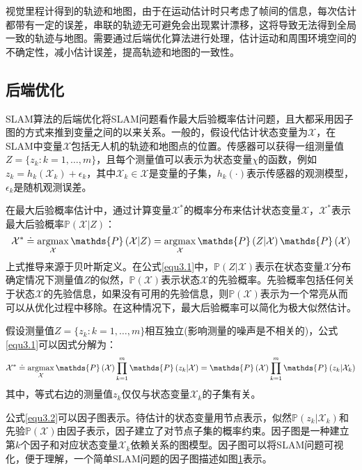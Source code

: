 视觉里程计得到的轨迹和地图，由于在运动估计时只考虑了帧间的信息，每次估计都带有一定的误差，串联的轨迹无可避免会出现累计漂移，这将导致无法得到全局一致的轨迹与地图。需要通过后端优化算法进行处理，估计运动和周围环境空间的不确定性，减小估计误差，提高轨迹和地图的一致性。


\subsection{后端优化}
SLAM算法的后端优化将SLAM问题看作最大后验概率估计问题，且大都采用因子图的方式来推到变量之间的以来关系。一般的，假设代估计状态变量为$\mathcal{X}$，在SLAM中变量$\mathcal{X}$包括无人机的轨迹和地图点的位置。传感器可以获得一组测量值$Z=\lbrace z_k:k=1,\ldots ,m\rbrace$，且每个测量值可以表示为状态变量$\chi$的函数，例如$z_k=h_k\left( \mathcal{X}_k \right)+\epsilon_k$，其中$\mathcal{X}_k \in \mathcal{X}$是变量的子集，$h_k(\cdot)$表示传感器的观测模型，$\epsilon_k$是随机观测误差。

在最大后验概率估计中，通过计算变量$\mathcal{X}^*$的概率分布来估计状态变量$\mathcal{X}$，$\mathcal{X}^*$表示最大后验概率$\mathds{P}\left(\mathcal{X} \vert Z\right)$：
\begin{equation}
\label{equ3.1}
\mathcal{X}^* 
\doteq 
\argmax \limits_{\mathcal{X}} \mathds{P}\left(\mathcal{X} \vert Z\right) 
=
\argmax \limits_{\mathcal{X}}\mathds{P}\left(Z \vert \mathcal{X}  \right)\mathds{P}\left(\mathcal{X}\right)
\end{equation}
上式推导来源于贝叶斯定义。在公式\ref{equ3.1}中，$\mathds{P}\left(Z \vert \mathcal{X}  \right)$表示在状态变量$\mathcal{X}$分布确定情况下测量值$Z$的似然，$\mathds{P}\left(\mathcal{X}\right)$表示状态$\mathcal{X}$的先验概率。先验概率包括任何关于状态$\mathcal{X}$的先验信息，如果没有可用的先验信息，则$\mathds{P}\left(\mathcal{X}\right)$表示为一个常亮从而可以从优化过程中移除。在这种情况下，最大后验概率可以简化为极大似然估计。

假设测量值$Z=\lbrace z_k:k=1,\ldots ,m\rbrace$相互独立(影响测量的噪声是不相关的)，公式\ref{equ3.1}可以因式分解为：
\begin{equation}
\label{equ3.2}
\mathcal{X}^* 
\doteq 
\argmax \limits_{\mathcal{X}} \mathds{P}\left(\mathcal{X}\right) \prod \limits_{k=1}^{m} \mathds{P}\left(z_k \vert \mathcal{X}  \right)
=
\mathds{P}\left(\mathcal{X}\right) \prod \limits_{k=1}^{m} \mathds{P}\left(z_k \vert \mathcal{X}_k  \right)
\end{equation}
其中，等式右边的测量值$z_k$仅仅与状态变量$\mathcal{X}_k$的子集有关。

公式\ref{equ3.2}可以因子图表示。待估计的状态变量用节点表示，似然$\mathds{P}\left(z_k \vert \mathcal{X}_k  \right)$和先验$\mathds{P}\left(\mathcal{X} \right)$由因子表示，因子建立了对节点子集的概率约束。因子图是一种建立第$k$个因子和对应状态变量$\mathcal{X}_k$依赖关系的图模型。因子图可以将SLAM问题可视化，便于理解，一个简单SLAM问题的因子图描述如图\ref{fig3.3}表示。
\begin{figure}
\label{fig3.3}

\end{figure}



